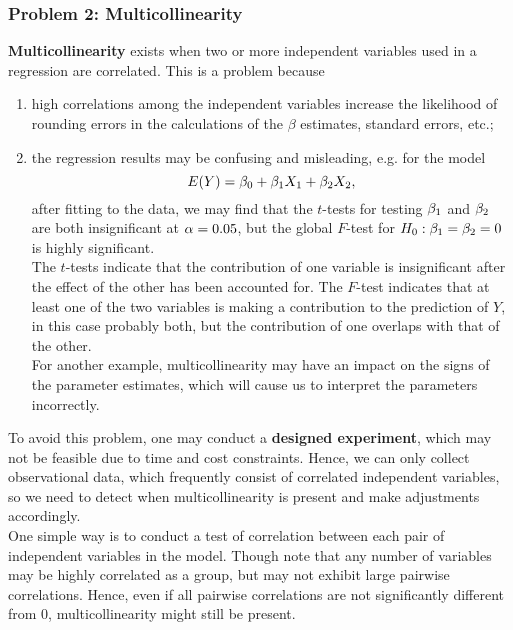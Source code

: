 \documentclass{report}
\begin{document}
	\subsubsection{Problem 2: Multicollinearity}
	\textbf{Multicollinearity} exists when two or more independent variables used in a regression are correlated. This is a problem because 
	\begin{enumerate}
		\item high correlations among the independent variables increase the likelihood of rounding errors in the calculations of the $\beta$ estimates, standard errors, etc.;
		\item the regression results may be confusing and misleading, e.g. for the model
		$$E(Y)=\beta_0+\beta_1X_1+\beta_2X_2,$$
		after fitting to the data, we may find that the $t$-tests for testing $\beta_1$ and $\beta_2$ are both insignificant at $\alpha=0.05$, but the global $F$-test for $H_0:\beta_1=\beta_2=0$ is highly significant. \\
		
		The $t$-tests indicate that the contribution of one variable is insignificant after the effect of the other has been accounted for. The $F$-test indicates that at least one of the two variables is making a contribution to the prediction of $Y$, in this case probably both, but the contribution of one overlaps with that of the other.\\
		
		For another example, multicollinearity may have an impact on the signs of the parameter estimates, which will cause us to interpret the parameters incorrectly.
	\end{enumerate}
	
	To avoid this problem, one may conduct a \textbf{designed experiment}, which may not be feasible due to time and cost constraints. Hence, we can only collect observational data, which frequently consist of correlated independent variables, so we need to detect when multicollinearity is present and make adjustments accordingly.\\
	
	One simple way is to conduct a test of correlation between each pair of independent variables in the model. Though note that any number of variables may be highly correlated as a group, but may not exhibit large pairwise correlations. Hence, even if all pairwise correlations are not significantly different from 0, multicollinearity might still be present.
	
	
\end{document}
